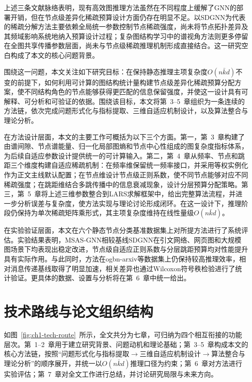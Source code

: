 上述三条文献脉络表明，现有高效图推理方法虽然在不同程度上缓解了GNN的部署开销，但在节点级差异化稀疏预算设计方面仍存在明显不足。以SDGNN为代表的稀疏分解方法主要依赖全局统一参数控制节点稀疏强度，尚未将节点拓扑差异及其频域影响系统地纳入预算设计过程；复杂图结构学习中的谱视角方法则更多停留在全图共享传播参数层面，尚未与节点级稀疏推理机制形成直接结合。这一研究空白构成了本文的核心问题背景。

围绕这一问题，本文关注如下研究目标：在保持静态推理主项复杂度$O(n\bar{k}d)$不变的前提下，如何利用可计算的图结构统计量构建节点级差异化稀疏预算分配方案，使不同结构角色的节点能够获得更匹配的信息保留强度，并使这一设计具有可解释、可分析和可验证的依据。围绕该目标，本文将第~3--5~章组织为一条连续的方法链，依次完成问题形式化与指标提取、三维自适应机制设计，以及算法整合与理论分析。

在方法设计层面\label{idx:innov:3dim}，本文的主要工作可概括为以下三个方面。第一，第~3~章构建了由谱间隙、节点谱能量、归一化局部图熵和节点中心性组成的图复杂度指标体系，为后续自适应参数设计提供统一的可计算输入。第二，第~4~章从频率、节点和跳距三个维度构建自适应稀疏机制：在频率维保留统一频率接口，并采用等权实例化作为正文主线默认配置；在节点维设计节点级正则系数，使不同节点能够对应不同稀疏强度；在跳距维结合多跳传播中的信息衰减现象，设计分层预算分配策略。第三，第~5~章将上述三维参数整合到LARS求解框架中，给出完整算法流程，并进一步分析误差与复杂度，使方法实现与理论讨论形成闭环。在这一设计下，推理阶段仍保持为单次稀疏矩阵乘形式，其主项复杂度维持在线性量级$O(n\bar{k}d)$。

在实验验证层面，本文在六个静态节点分类基准数据集上对所提方法进行了系统评估。实验结果表明，MSAS-GNN相较基线SDGNN在引文网络、网页图和大规模图场景下均表现出稳定改进，节点级自适应正则系数与分层跳距预算均对性能提升具有实际作用。与此同时，方法在ogbn-arxiv等数据集上仍保持较高推理效率，相对消息传递基线取得了明显加速，相关差异也通过Wilcoxon符号秩检验进行了统计验证。更具体的数据、设置与分析将在第~6~章中统一给出。

\section{技术路线与论文组织结构}
\label{sec:ch1-structure}

如图~\ref{fig:ch1-tech-route}~所示，全文共分为七章，可归纳为四个相互衔接的功能层次。第~1--2~章用于建立研究背景、问题动机和理论基础；第~3--5~章构成本文的核心方法链，按照“问题形式化与指标提取$\rightarrow$三维自适应机制设计$\rightarrow$算法整合与理论分析”的顺序展开，并统一以$O(n\bar{k}d)$推理口径为约束；第~6~章对方法进行实验评估；第~7~章对全文工作进行总结，并讨论研究局限与未来方向。

